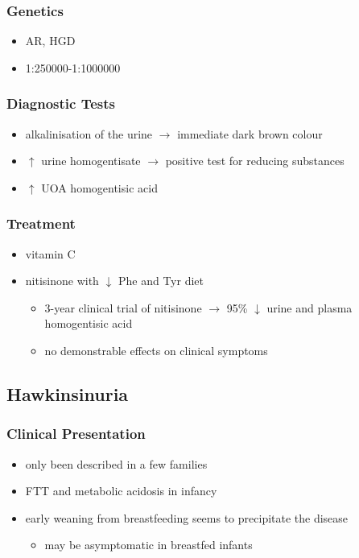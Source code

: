 \documentclass{scrartcl}
\begin{document}
\subsubsection{Genetics}
\label{sec:org652be81}
\begin{itemize}
\item AR, HGD
\item 1:250000-1:1000000
\end{itemize}
\subsubsection{Diagnostic Tests}
\label{sec:org522bac4}
\begin{itemize}
\item alkalinisation of the urine \(\to\) immediate dark brown colour
\item \(\uparrow\) urine homogentisate \(\to\) positive test for reducing substances
\item \(\uparrow\) UOA homogentisic acid
\end{itemize}
\subsubsection{Treatment}
\label{sec:org34da021}
\begin{itemize}
\item vitamin C
\item nitisinone with \(\downarrow\) Phe and Tyr diet
\begin{itemize}
\item 3-year clinical trial of nitisinone \(\to\) 95\% \(\downarrow\) urine and plasma homogentisic acid
\item no demonstrable effects on clinical symptoms
\end{itemize}
\end{itemize}

\subsection{Hawkinsinuria}
\label{sec:org9f7e2ad}
\subsubsection{Clinical Presentation}
\label{sec:orgf83d856}
\begin{itemize}
\item only been described in a few families
\item FTT and metabolic acidosis in infancy
\item early weaning from breastfeeding seems to precipitate the disease
\begin{itemize}
\item may be asymptomatic in breastfed infants
\end{itemize}
\end{itemize}
\end{document}
